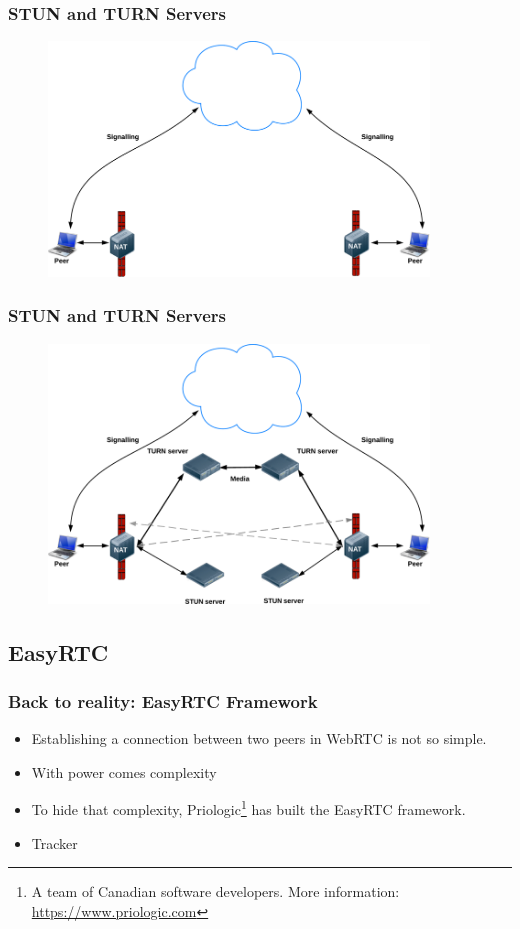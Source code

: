 \documentclass{beamer}
\begin{document}
\begin{frame}[t]\frametitle{STUN and TURN Servers}
\begin{figure}
\centering
\includegraphics[keepaspectratio=true, width=0.9\textwidth]{images/firewall}
\end{figure}
\end{frame}

\begin{frame}[t]\frametitle{STUN and TURN Servers}
\begin{figure}
\centering
\includegraphics[keepaspectratio=true, width=0.9\textwidth]{images/turn}
\end{figure}
\end{frame}


\subsection{EasyRTC}

\begin{frame}\frametitle{Back to reality: EasyRTC Framework}
\begin{itemize}
  \item Establishing a connection between two peers in WebRTC is not so simple.
  \item With power comes complexity
  \item To hide that complexity, Priologic\footnote{A team of Canadian software developers. More information: \url{https://www.priologic.com}} has built the EasyRTC framework.
  \item Tracker
\end{itemize}
\end{frame}
\end{document}
